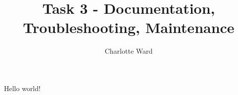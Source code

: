\documentclass{article}
\title{Task 3 - Documentation, Troubleshooting, Maintenance}
\author{Charlotte Ward}
\begin{document}
  \maketitle

\cite{cnet:1}

Hello world!

\printbibliography
\end{document}
